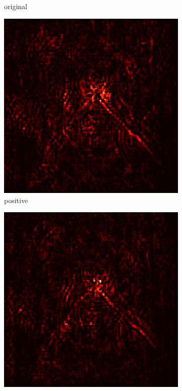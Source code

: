 \documentclass[preprint,12pt]{elsarticle}
\begin{document}
\begin{figure}
\begin{subfigure}{0.14\linewidth}
        \caption{original}
    \end{subfigure}
    \hfill
    \begin{subfigure}{0.14\textwidth}
        \centering
        \includegraphics[width=\linewidth]{../visualizations/examples/imagenette/resnet18/positive_saliency_map/7.png}
        \caption{positive}
    \end{subfigure}
    \hfill
    \begin{subfigure}{0.14\textwidth}
        \centering
        \includegraphics[width=\linewidth]{../visualizations/examples/imagenette/resnet18/negative_saliency_map/7.png}

\end{subfigure}
\end{figure}
\end{document}
